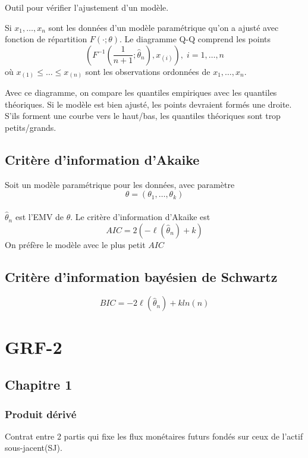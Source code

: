 \documentclass[]{book}
\theoremstyle{definition}
\theoremstyle{definition}
\theoremstyle{definition}
\theoremstyle{remark}
\begin{document}
Outil pour vérifier l'ajustement d'un modèle.

Si \(x_1,\dots,x_n\) sont les données d'un modèle paramétrique qu'on a
ajusté avec fonction de répartition \(F(\cdot;\theta)\). Le diagramme
Q-Q comprend les points \[
\left (F^{-1}\left(\dfrac{1}{n+1};\hat{\theta}_n\right),x_{(i)}\right ),\;i=1,\dots,n
\] où \(x_{(1)} \leq \dots \leq x_{(n)}\) sont les observations
ordonnées de \(x_1,\dots,x_n\).

Avec ce diagramme, on compare les quantiles empiriques avec les
quantiles théoriques. Si le modèle est bien ajusté, les points devraient
formés une droite. S'ils forment une courbe vers le haut/bas, les
quantiles théoriques sont trop petits/grands.

\section{Critère d'information
d'Akaike}\label{critere-dinformation-dakaike}

Soit un modèle paramétrique pour les données, avec paramètre \[
\theta=(\theta_1,\dots,\theta_k) 
\]\\
\(\hat{\theta}_n\) est l'EMV de \(\theta\). Le critère d'information
d'Akaike est \[
AIC = 2(-\ell(\hat{\theta}_n)+k)
\] On préfère le modèle avec le plus petit \(AIC\)

\section{Critère d'information bayésien de
Schwartz}\label{critere-dinformation-bayesien-de-schwartz}

\[
BIC = -2\ell(\hat{\theta}_n)+k ln(n)
\]

\chapter{GRF-2}\label{grf-2}

\section{Chapitre 1}\label{chapitre-1}

\subsection*{Produit dérivé}\label{produit-derive}

Contrat entre 2 partis qui fixe les flux monétaires futurs fondés sur
ceux de l'actif sous-jacent(SJ).
\end{document}
